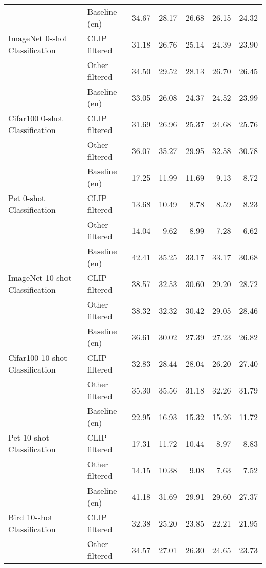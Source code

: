 {\begin{longtable}{l|l|rrrrr}
\multirow[t]{3}{*}{ImageNet 0-shot Classification} & Baseline (en) & 34.67 & 28.17 & 26.68 & 26.15 & 24.32 \\
 & CLIP filtered & 31.18 & 26.76 & 25.14 & 24.39 & 23.90 \\
 & Other filtered & 34.50 & 29.52 & 28.13 & 26.70 & 26.45 \\
\midrule
\multirow[t]{3}{*}{Cifar100 0-shot Classification} & Baseline (en) & 33.05 & 26.08 & 24.37 & 24.52 & 23.99 \\
 & CLIP filtered & 31.69 & 26.96 & 25.37 & 24.68 & 25.76 \\
 & Other filtered & 36.07 & 35.27 & 29.95 & 32.58 & 30.78 \\
\midrule
\multirow[t]{3}{*}{Pet 0-shot Classification} & Baseline (en) & 17.25 & 11.99 & 11.69 & 9.13 & 8.72 \\
 & CLIP filtered & 13.68 & 10.49 & 8.78 & 8.59 & 8.23 \\
 & Other filtered & 14.04 & 9.62 & 8.99 & 7.28 & 6.62 \\
\midrule
\multirow[t]{3}{*}{ImageNet 10-shot Classification} & Baseline (en) & 42.41 & 35.25 & 33.17 & 33.17 & 30.68 \\
 & CLIP filtered & 38.57 & 32.53 & 30.60 & 29.20 & 28.72 \\
 & Other filtered & 38.32 & 32.32 & 30.42 & 29.05 & 28.46 \\
\midrule
\multirow[t]{3}{*}{Cifar100 10-shot Classification} & Baseline (en) & 36.61 & 30.02 & 27.39 & 27.23 & 26.82 \\
 & CLIP filtered & 32.83 & 28.44 & 28.04 & 26.20 & 27.40 \\
 & Other filtered & 35.30 & 35.56 & 31.18 & 32.26 & 31.79 \\
\midrule
\multirow[t]{3}{*}{Pet 10-shot Classification} & Baseline (en) & 22.95 & 16.93 & 15.32 & 15.26 & 11.72 \\
 & CLIP filtered & 17.31 & 11.72 & 10.44 & 8.97 & 8.83 \\
 & Other filtered & 14.15 & 10.38 & 9.08 & 7.63 & 7.52 \\
\midrule
\multirow[t]{3}{*}{Bird 10-shot Classification} & Baseline (en) & 41.18 & 31.69 & 29.91 & 29.60 & 27.37 \\
 & CLIP filtered & 32.38 & 25.20 & 23.85 & 22.21 & 21.95 \\
 & Other filtered & 34.57 & 27.01 & 26.30 & 24.65 & 23.73 \\

\end{longtable}}
